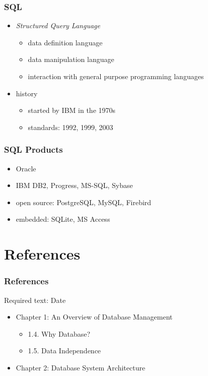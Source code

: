 \documentclass[dvipsnames]{beamer}
\theoremstyle{plain}
\begin{document}
\begin{frame}
  \frametitle{SQL}

  \begin{itemize}
    \item \emph{Structured Query Language}
    \begin{itemize}
      \item data definition language
      \item data manipulation language
      \item interaction with general purpose programming languages
    \end{itemize}

    \pause
    \bigskip
    \item history
    \begin{itemize}
      \item started by IBM in the 1970s
      \item standards: 1992, 1999, 2003
    \end{itemize}
  \end{itemize}
\end{frame}

\begin{frame}
  \frametitle{SQL Products}

  \begin{itemize}
    \item Oracle
    \item IBM DB2, Progress, MS-SQL, Sybase
    \item open source: PostgreSQL, MySQL, Firebird
    \item embedded: SQLite, MS Access
  \end{itemize}
\end{frame}

\section*{References}

\begin{frame}
  \frametitle{References}

  \begin{block}{Required text: Date}
    \begin{itemize}
      \item Chapter 1: An Overview of Database Management
      \begin{itemize}
        \item 1.4. \alert{Why Database?}
        \item 1.5. \alert{Data Independence}
      \end{itemize}

      \item Chapter 2: \alert{Database System Architecture}
    \end{itemize}
  \end{block}
\end{frame}
\end{document}
